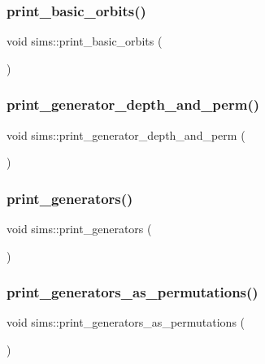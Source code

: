 \subsubsection{\texorpdfstring{print\+\_\+basic\+\_\+orbits()}{print\_basic\_orbits()}}
{\footnotesize\ttfamily void sims\+::print\+\_\+basic\+\_\+orbits (\begin{DoxyParamCaption}{ }\end{DoxyParamCaption})}

\mbox{\label{classsims_a4630b82437f49635da45c5fc1953d919}} 
\subsubsection{\texorpdfstring{print\+\_\+generator\+\_\+depth\+\_\+and\+\_\+perm()}{print\_generator\_depth\_and\_perm()}}
{\footnotesize\ttfamily void sims\+::print\+\_\+generator\+\_\+depth\+\_\+and\+\_\+perm (\begin{DoxyParamCaption}{ }\end{DoxyParamCaption})}

\mbox{\label{classsims_a49dfebd7ef9b23cb3c1264bc462f2233}} 
\subsubsection{\texorpdfstring{print\+\_\+generators()}{print\_generators()}}
{\footnotesize\ttfamily void sims\+::print\+\_\+generators (\begin{DoxyParamCaption}{ }\end{DoxyParamCaption})}

\mbox{\label{classsims_ae46e51d796b88c621c497fc1cb7cf90e}} 
\subsubsection{\texorpdfstring{print\+\_\+generators\+\_\+as\+\_\+permutations()}{print\_generators\_as\_permutations()}}
{\footnotesize\ttfamily void sims\+::print\+\_\+generators\+\_\+as\+\_\+permutations (\begin{DoxyParamCaption}{ }\end{DoxyParamCaption})}

